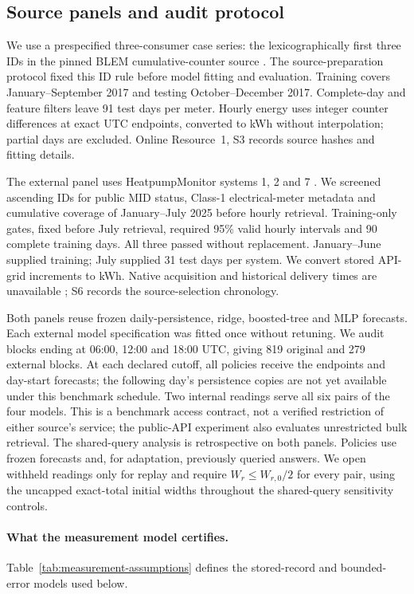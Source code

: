 \documentclass[12pt]{article}
\begin{document}
\FloatBarrier
\subsection{Source panels and audit protocol}
\label{sec:joint-protocol-summary}
We use a prespecified three-consumer case series: the lexicographically first
three IDs in the pinned BLEM cumulative-counter source \citep{blem}. The
source-preparation protocol fixed this ID rule before model fitting and
evaluation. Training covers January--September
2017 and testing October--December 2017. Complete-day and feature filters
leave 91 test days per meter. Hourly energy uses integer counter differences
at exact UTC endpoints, converted to kWh without interpolation; partial days
are excluded. Online Resource~1, S3 records source hashes and fitting details.

The external panel uses HeatpumpMonitor systems 1, 2 and 7
\citep{hpmabout,hpmapi}. We screened ascending IDs for public MID
status, Class-1 electrical-meter metadata and cumulative coverage of
January--July 2025 before hourly retrieval. Training-only gates, fixed
before July retrieval, required 95\% valid hourly intervals
and 90 complete training days. All three passed without replacement.
January--June supplied training; July supplied 31 test days per system.
We convert stored API-grid increments to kWh. Native acquisition and
historical delivery times are unavailable \citep{hpmcode}; S6 records the
source-selection chronology.

Both panels reuse frozen daily-persistence, ridge, boosted-tree and MLP
forecasts. Each external model specification was fitted once without
retuning. We audit blocks ending at 06:00, 12:00 and 18:00 UTC, giving
819 original and 279 external blocks. At each declared cutoff, all policies
receive the endpoints and day-start forecasts; the following day's
persistence copies are not yet available under this benchmark schedule.
Two internal readings serve all six pairs of the four models. This is a
benchmark access contract, not a verified restriction of either source's service;
the public-API experiment also evaluates unrestricted bulk retrieval.
The shared-query analysis is retrospective on both panels. Policies use
frozen forecasts and, for adaptation, previously queried answers. We open
withheld readings only for replay and require $W_r\leq W_{r,0}/2$ for every pair, using the
uncapped exact-total initial widths throughout the shared-query sensitivity controls.
\paragraph{What the measurement model certifies.}
Table~\ref{tab:measurement-assumptions} defines the stored-record and
bounded-error models used below.
\end{document}
